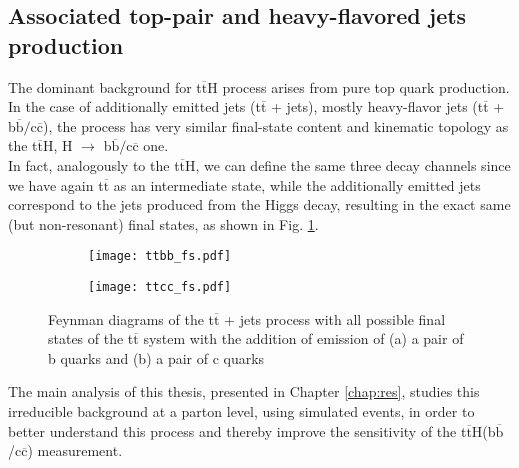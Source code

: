 \subsection{\label{intro_ttbb}Associated top-pair and heavy-flavored jets production}
\noindent The dominant background for t$\overline{\text{t}}$H process arises from pure top quark production. In the case of additionally emitted jets (t$\overline{\text{t}}$ + jets), mostly heavy-flavor jets (t$\overline{\text{t}}$ + b$\overline{\text{b}}/$c$\overline{\text{c}}$), the process has very similar final-state content and kinematic topology as the t$\overline{\text{t}}$H, H $\rightarrow$ b$\overline{\text{b}}/$c$\overline{\text{c}}$ one.\\
\indent In fact, analogously to the t$\overline{\text{t}}$H, we can define the same three decay channels since we have again t$\overline{\text{t}}$ as an intermediate state, while the additionally emitted jets correspond to the jets produced from the Higgs decay, resulting in the exact same (but non-resonant) final states, as shown in Fig. \ref{fig:ttbb}.
\begin{figure}[H]
    \centering
    \begin{subfigure}{0.45\textwidth}
        \texttt{[image: ttbb\_fs.pdf]}
        \caption{}
    \end{subfigure}
    \begin{subfigure}{0.45\textwidth}
        \texttt{[image: ttcc\_fs.pdf]}
        \caption{}
    \end{subfigure}
    \caption{Feynman diagrams of the t$\overline{\text{t}}$ + jets process with all possible final states of the t$\overline{\text{t}}$ system  with the addition of emission of (a) a pair of b quarks and (b) a pair of c quarks}
    \label{fig:ttbb}
\end{figure}
The main analysis of this thesis, presented in Chapter \ref{chap:res}, studies this irreducible background at a parton level, using simulated events, in order to better understand this process and thereby improve the sensitivity of the t$\overline{\text{t}}$H(b$\overline{\text{b}}$/c$\overline{\text{c}}$) measurement.  